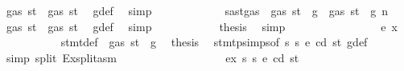 \begin{isabellebody}
\ {\isachardoublequoteopen}gas\ st{}{\isacharprime}{\kern0pt}\ {\isasymle}\ gas\ st{\isacharprime}{\kern0pt}{\isachardoublequoteclose}\ \isamarkupfalse%
\ g{\isacharunderscore}{\kern0pt}def\ \isamarkupfalse%
\ simp\isanewline
\ \ \ \ \ \ \ \ \isamarkupfalse%
\ \isamarkupfalse%
\ {}{\isacharparenleft}{\kern0pt}{}{\isacharparenright}{\kern0pt}{\isacharbrackleft}{\kern0pt}\ {\isacharquery}{\kern0pt}s{\isacharprime}{\kern0pt}a{\isacharequal}{\kern0pt}{\isachardoublequoteopen}st{\isasymlparr}gas\ {\isacharcolon}{\kern0pt}{\isacharequal}{\kern0pt}\ gas\ st\ {\isacharminus}{\kern0pt}\ g{\isasymrparr}{\isachardoublequoteclose}{\isacharbrackright}{\kern0pt}\ {\isacartoucheopen}{\isasymnot}\ gas\ st\ {\isasymle}\ g{\isacartoucheclose}\ n\ \isamarkupfalse%
\ {\isachardoublequoteopen}gas\ st{\isacharprime}{\kern0pt}\ {\isasymle}\ gas\ st{\isachardoublequoteclose}\ \isamarkupfalse%
\ g{\isacharunderscore}{\kern0pt}def\ \isamarkupfalse%
\ simp\isanewline
\ \ \ \ \ \ \ \ \isamarkupfalse%
\ \isamarkupfalse%
\ {\isacharquery}{\kern0pt}thesis\ \isamarkupfalse%
\ simp\isanewline
\ \ \ \ \ \ \isamarkupfalse%
\isanewline
\ \ \ \ \ \ \ \ \isamarkupfalse%
\ {\isacharparenleft}{\kern0pt}e\ x{\isacharparenright}{\kern0pt}\isanewline
\ \ \ \ \ \ \ \ \isamarkupfalse%
\ {}\ stmt{\isacharunderscore}{\kern0pt}def\ {\isacharbackquoteopen}{\isasymnot}\ gas\ st\ {\isasymle}\ g{\isacharbackquoteclose}\ \isamarkupfalse%
\ {\isacharquery}{\kern0pt}thesis\ \isamarkupfalse%
\ stmt{\isachardot}{\kern0pt}psimps{\isacharparenleft}{\kern0pt}{}{\isacharparenright}{\kern0pt}{\isacharbrackleft}{\kern0pt}of\ s{}\ s{}\ e\ cd\ st{\isacharbrackright}{\kern0pt}\ g{\isacharunderscore}{\kern0pt}def\ \isamarkupfalse%
\ {\isacharparenleft}{\kern0pt}simp\ split{\isacharcolon}{\kern0pt}\ Ex{\isachardot}{\kern0pt}split{\isacharunderscore}{\kern0pt}asm{\isacharparenright}{\kern0pt}\isanewline
\ \ \ \ \ \ \isamarkupfalse%
\isanewline
\ \ \ \ \isamarkupfalse%
\isanewline
\ \ \isamarkupfalse%
\isanewline
{}\isamarkupfalse%
\isanewline
\ \ \isamarkupfalse%
\ {\isacharparenleft}{\kern0pt}{}\ ex\ s{}\ s{}\ e\ cd\ st{\isacharparenright}{\kern0pt}\isanewline

\end{isabellebody}
